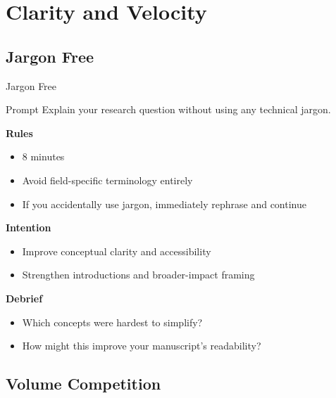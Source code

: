 \documentclass{beamer}
\begin{document}
\section{Clarity and Velocity}

\subsection{Jargon Free}

\begin{frame}{Jargon Free}
\begin{block}{Prompt}
Explain your research question without using any technical jargon.
\end{block}

\vspace{0.8em}
\textbf{Rules}
\begin{itemize}
    \item 8 minutes
    \item Avoid field-specific terminology entirely
    \item If you accidentally use jargon, immediately rephrase and continue
\end{itemize}

\textbf{Intention}
\begin{itemize}
    \item Improve conceptual clarity and accessibility
    \item Strengthen introductions and broader-impact framing
\end{itemize}

\textbf{Debrief}
\begin{itemize}
    \item Which concepts were hardest to simplify?
    \item How might this improve your manuscript's readability?
\end{itemize}
\end{frame}

\subsection{Volume Competition}
\end{document}
